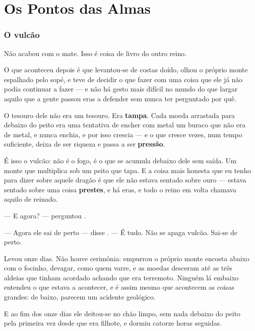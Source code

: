 \documentclass[livro.tex]{subfiles}
\begin{document}
\part{Os Pontos das Almas}

\section{O vulcão}

Não acabou com o mate. Isso é coisa de livro do outro reino.

O que aconteceu depois é que \Ven levantou-se de costas doído, olhou o próprio monte espalhado
pelo sopé, e teve de decidir o que fazer com uma coisa que ele já não podia continuar a fazer ---
e não há gesto mais difícil no mundo do que largar aquilo que a gente passou eras a defender sem
nunca ter perguntado por quê.

O tesouro dele não era um tesouro. Era \textbf{tampa}. Cada moeda arrastada para debaixo do peito
era uma tentativa de encher com metal um buraco que não era de metal, e nunca enchia, e por isso
crescia --- e o que cresce vezes, num tempo suficiente, deixa de ser riqueza e passa a ser
\textbf{pressão}.

É isso o vulcão: não é o fogo, é o que se acumula debaixo dele sem saída. Um monte que multiplica
sob um peito que tapa. E a coisa mais honesta que eu tenho para dizer sobre aquele dragão é que
ele não estava sentado sobre ouro --- estava sentado sobre uma coisa \textbf{prestes}, e há eras,
e todo o reino em volta chamava aquilo de reinado.

\medskip

--- E agora? --- perguntou \Ben .

--- Agora ele sai de perto --- disse \Qui . --- É tudo. Não se apaga vulcão. Sai-se de perto.

\medskip

Levou onze dias. Não houve cerimônia: \Ven empurrou o próprio monte encosta abaixo com o focinho,
devagar, como quem varre, e as moedas desceram até as três aldeias que tinham acordado achando
que era terremoto. Ninguém lá embaixo entendeu o que estava a acontecer, e é assim mesmo que
acontecem as coisas grandes: de baixo, parecem um acidente geológico.

E ao fim dos onze dias ele deitou-se no chão limpo, sem nada debaixo do peito pela primeira vez
desde que era filhote, e dormiu catorze horas seguidas.
\end{document}
